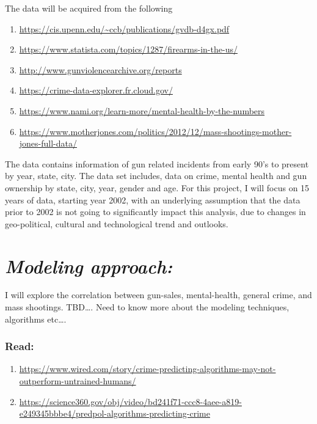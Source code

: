 \documentclass[]{article}
\providecommand{\tightlist}{%
  \setlength{\itemsep}{0pt}\setlength{\parskip}{0pt}}
\begin{document}
The data will be acquired from the following

\begin{enumerate}
\def\labelenumi{\arabic{enumi}.}
\tightlist
\item
  \url{https://cis.upenn.edu/~ccb/publications/gvdb-d4gx.pdf}
\item
  \url{https://www.statista.com/topics/1287/firearms-in-the-us/}
\item
  \url{http://www.gunviolencearchive.org/reports}
\item
  \url{https://crime-data-explorer.fr.cloud.gov/}
\item
  \url{https://www.nami.org/learn-more/mental-health-by-the-numbers}
\item
  \url{https://www.motherjones.com/politics/2012/12/mass-shootings-mother-jones-full-data/}
\end{enumerate}

The data contains information of gun related incidents from early 90's
to present by year, state, city. The data set includes, data on crime,
mental health and gun ownership by state, city, year, gender and age.
For this project, I will focus on 15 years of data, starting year 2002,
with an underlying assumption that the data prior to 2002 is not going
to significantly impact this analysis, due to changes in geo-political,
cultural and technological trend and outlooks.

\section{\texorpdfstring{\emph{Modeling
approach:}}{Modeling approach:}}\label{modeling-approach}

I will explore the correlation between gun-sales, mental-health, general
crime, and mass shootings. TBD\ldots{}. Need to know more about the
modeling techniques, algorithms etc\ldots{}.

\subsubsection{Read:}\label{read}

\begin{enumerate}
\def\labelenumi{\arabic{enumi}.}
\tightlist
\item
  \url{https://www.wired.com/story/crime-predicting-algorithms-may-not-outperform-untrained-humans/}
\item
  \url{https://science360.gov/obj/video/bd241f71-ccc8-4aee-a819-e249345bbbe4/predpol-algorithms-predicting-crime}
\end{enumerate}
\end{document}

